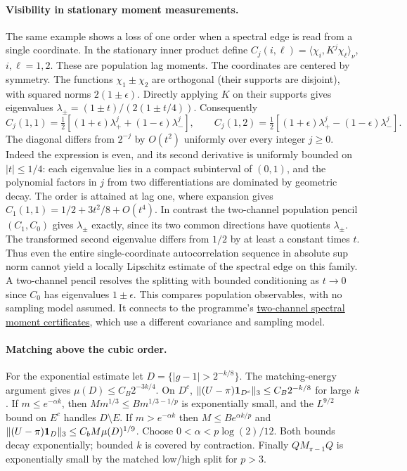 \paragraph{Visibility in stationary moment measurements.}
The same example shows a loss of one order when a spectral edge is read
from a single coordinate. In the stationary inner product define
$C_j(i,\ell)=\langle\chi_i,K^j\chi_\ell\rangle_\nu$, $i,\ell=1,2$.
These are population lag moments. The coordinates are centered by symmetry.
The functions $\chi_1\pm\chi_2$ are orthogonal (their supports are
disjoint), with squared norms $2(1\pm\epsilon)$. Directly applying $K$
on their supports gives eigenvalues
$\lambda_\pm=(1\pm t)/(2(1\pm t/4))$. Consequently
\[
 C_j(1,1)=\tfrac12[(1+\epsilon)\lambda_+^j+
                          (1-\epsilon)\lambda_-^j],\qquad
 C_j(1,2)=\tfrac12[(1+\epsilon)\lambda_+^j-
                          (1-\epsilon)\lambda_-^j].
\]
The diagonal differs from $2^{-j}$ by $O(t^2)$ uniformly over every
integer $j\ge0$. Indeed the expression is even, and its second
derivative is uniformly bounded on $|t|\le1/4$: each eigenvalue lies
in a compact subinterval of $(0,1)$, and the polynomial factors in $j$
from two differentiations are dominated by geometric decay. The order
is attained at lag one, where expansion gives
$C_1(1,1)=1/2+3t^2/8+O(t^4)$. In contrast the two-channel population
pencil $(C_1,C_0)$ gives $\lambda_\pm$ exactly, since its two common
directions have quotients $\lambda_\pm$. The transformed second eigenvalue differs from $1/2$
by at least a constant times $t$. Thus even the entire
single-coordinate autocorrelation sequence in absolute sup norm
cannot yield a locally Lipschitz estimate of the spectral edge on this
family. A two-channel pencil resolves the splitting with bounded
conditioning as $t\to0$ since $C_0$ has eigenvalues $1\pm\epsilon$.
This compares population observables, with no sampling model assumed.
It connects to the programme's
\href{https://github.com/lluiseriksson/finite-sample-spectral-certificates/blob/7ccc9e925847313a3b11132705b4805e3cf4ff8a/SEPARATED_SIGN_TEST.md}{two-channel spectral moment certificates},
which use a different covariance and sampling model.

\paragraph{Matching above the cubic order.}
For the exponential estimate let $D=\{|g-1|>2^{-k/8}\}$.
The matching-energy argument gives $\mu(D)\le C_B2^{-3k/4}$.
On $D^c$, $\|(U-\pi){\bf1}_{D^c}\|_3\le C_B2^{-k/8}$ for large $k$.
If $m\le e^{-\alpha k}$, then $M m^{1/3}\le Bm^{1/3-1/p}$
is exponentially small, and the $L^{9/2}$ bound on $E^c$ handles
$D\setminus E$. If $m>e^{-\alpha k}$ then $M\le Be^{\alpha k/p}$
and $\|(U-\pi){\bf1}_D\|_3\le C_b M\mu(D)^{1/9}$. Choose
$0<\alpha<p\log(2)/12$. Both bounds decay exponentially; bounded
$k$ is covered by contraction. Finally $QM_{\pi-1}Q$ is exponentially
small by the matched low/high split for $p>3$.

